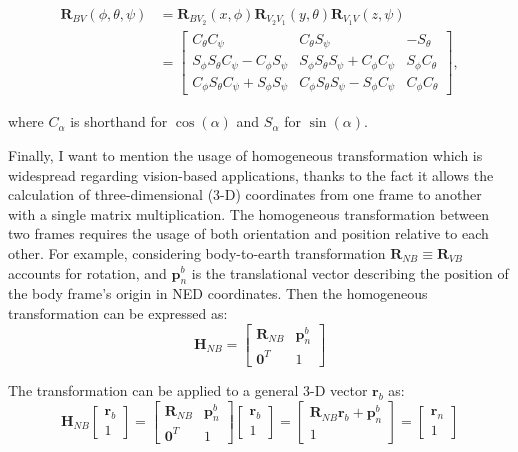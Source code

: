 \begin{equation}
\begin{aligned}
    \mathbf{R}_{BV}(\phi,\theta,\psi)&=\mathbf{R}_{BV_2}(x,\phi)\mathbf{R}_{V_2V_1}(y,\theta)\mathbf{R}_{V_1V}(z,\psi) \\
    &=
    \begin{bmatrix}
        C_\theta C_\psi & C_\theta S_\psi & -S_\theta \\
        S_\phi S_\theta C_\psi - C_\phi S_\psi & S_\phi S_\theta S_\psi + C_\phi C_\psi & S_\phi C_\theta \\
        C_\phi S_\theta C_\psi + S_\phi S_\psi & C_\phi S_\theta S_\psi - S_\phi C_\psi & C_\phi C_\theta
    \end{bmatrix}, 
\end{aligned}
\label{eq:euler-angles}
\end{equation}

where $C_\alpha$ is shorthand for $\cos(\alpha)$ and $S_\alpha$ for $\sin(\alpha)$.

Finally, I want to mention the usage of homogeneous transformation which is widespread regarding vision-based applications, thanks to the fact it allows the calculation of three-dimensional (3-D) coordinates from one frame to another with a single matrix multiplication. The homogeneous transformation between two frames requires the usage of both orientation and position relative to each other. For example, considering body-to-earth transformation $\mathbf{R}_{NB}\equiv\mathbf{R}_{VB}$ accounts for rotation, and $\mathbf{p}_n^b$ is the translational vector describing the position of the body frame's origin in NED coordinates. Then the homogeneous transformation can be expressed as:
\begin{equation}
    \mathbf{H}_{NB}=\begin{bmatrix}
        \mathbf{R}_{NB} & \mathbf{p}_n^b \\
        \mathbf{0}^T & 1
    \end{bmatrix}
    \label{eq:hom-e2b}
\end{equation}

The transformation can be applied to a general 3-D vector $\mathbf{r}_b$ as:
\begin{equation}
    \mathbf{H}_{NB}\begin{bmatrix}
        \mathbf{r}_b \\ 1
    \end{bmatrix}=\begin{bmatrix}
        \mathbf{R}_{NB} & \mathbf{p}_n^b\\
        \mathbf{0}^T & 1
    \end{bmatrix}\begin{bmatrix}
        \mathbf{r}_b \\ 1
    \end{bmatrix}=\begin{bmatrix}
    \mathbf{R}_{NB}\mathbf{r}_b+\mathbf{p}_n^b \\ 1
    \end{bmatrix} = \begin{bmatrix}
        \mathbf{r}_n \\ 1
    \end{bmatrix}
\end{equation}

